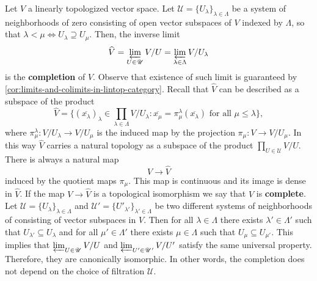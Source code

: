 \begin{definition}\label{def:completion}
	Let $V$ a linearly topologized vector space. Let $\mathscr{U} = \{U_{\lambda}\}_{\lambda\in \Lambda}$ be a system of neighborhoods of zero consisting of open vector subspaces of $V$ indexed by $\Lambda$, so that $\lambda < \mu \iff U_{\lambda} \supseteq U_{\mu}$. Then, the inverse limit
	\[
		\widehat{V} = \varprojlim_{U\in \mathscr{U}} V/U = \varprojlim_{\lambda\in \Lambda} V/U_{\lambda}
	\]
	is the \textbf{completion} of $V$. Observe that existence of such limit is guaranteed by \cref{cor:limits-and-colimits-in-lintop-category}. Recall that $\widehat{V}$ can be described as a subspace of the product 
	\[
		\widehat{V} = \{(\overline{x_{\lambda}})_{\lambda}\in \prod_{\lambda\in \Lambda} V/U_{\lambda}\colon  \overline{x_{\mu}} = \pi_{\mu}^{\lambda}(\overline{x_{\lambda}}) \text{ for all } \mu \leq \lambda \},
	\] 
	where $\pi_{\mu}^{\lambda}\colon V/U_{\lambda} \to V/U_{\mu}$ is the induced map by the projection $\pi_{\mu}\colon V \to V/U_{\mu}$. In this way $\widehat{V}$ carries a natural topology as a subspace of the product $\prod_{U\in \mathscr{U}} V/U$.  There is always a natural map
	\[
		V \to \widehat{V}
	\]
	induced by the quotient maps $\pi_{\mu}$. This map is continuous and its image is dense in $\widehat{V}$. If the map $V \to \widehat{V}$ is a topological isomorphism we say that $V$ is \textbf{complete}. Let $\mathscr{U} = \{U_{\lambda}\}_{\lambda\in \Lambda}$ and $\mathscr{U}' = \{U'_{\lambda'}\}_{\lambda' \in \Lambda}$ be two different systems of neighborhoods of consisting of vector subspaces in $V$. Then for all $\lambda \in \Lambda$ there exists $\lambda'\in \Lambda'$ such that $U_{\lambda'} \subseteq U_{\lambda}$ and for all $\mu'\in \Lambda'$ there exists $\mu\in \Lambda$ such that $U_{\mu}\subseteq U_{\mu'}$. This implies that $\varprojlim_{U\in \mathscr{U}} V/U$ and $\varprojlim_{U'\in \mathscr{U}'} V/U'$ satisfy the same universal property. Therefore, they are canonically isomorphic. In other words, the completion does not depend on the choice of filtration $\mathscr{U}$.
\end{definition}

